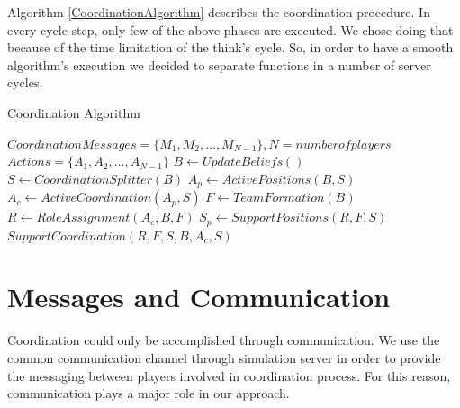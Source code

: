 Algorithm \ref{CoordinationAlgorithm} describes the coordination procedure. In every cycle-step, only few of the above phases are executed. We chose doing that because of the time limitation of the think's cycle. So, in order to have a smooth algorithm's execution we decided to separate functions in a number of server cycles.

\begin{algorithm}[htb!]
\caption{Coordination Algorithm }
\label{CoordinationAlgorithm}
\begin{algorithmic}[1]
$Coordination Messages = \lbrace M_{1},M_{2},...,M_{N-1} \rbrace, N = number of players $
$Actions = \lbrace A_{1},A_{2},...,A_{N-1} \rbrace$
\STATE $B \leftarrow Update Beliefs() $
\STATE $S \leftarrow Coordination Splitter(B) $
\STATE $A_{p} \leftarrow Active Positions(B,S) $
\STATE $A_{c} \leftarrow Active Coordination(A_{p},S) $
\STATE $ F \leftarrow TeamFormation(B) $
\STATE $ R \leftarrow Role Assignment(A_{c},B,F) $
\STATE $ S_{p} \leftarrow Support Positions(R,F,S) $
\STATE $ Support Coordination(R,F,S,B,A_{c},S) $
\ENDIF
\end{algorithmic}
\end{algorithm}


\section{Messages and Communication}
Coordination could only be accomplished through communication. We use the common communication channel through simulation server in order to provide the messaging between players involved in coordination process. For this reason, communication plays a major role in our approach. 

